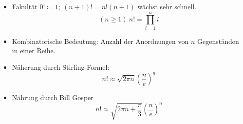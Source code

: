 \begin{itemize}
    \item Fakultät $0! \coloneqq 1;\ (n+1)!=n!(n+1)$ wächst sehr schnell.
    $$(n \geq 1)\ n! = \prod\limits_{i=1}^n i$$
    \item Kombinatorische Bedeutung: Anzahl der Anordnungen von $n$ Gegenständen in einer Reihe.
    \item Näherung durch Stirling-Formel:
    $$n! \approx \sqrt{2 \pi n} \left(\frac{n}{e}\right)^n$$
    \item Nährung durch Bill Gosper
    $$n! \approx \sqrt{2 \pi n + \frac{\pi}{3}}\left(\frac{n}{e}\right)^n$$
\end{itemize}